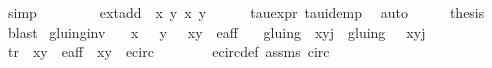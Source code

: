\begin{isabellebody}
\ simp\isanewline
\ \ \isamarkupfalse%
\ \isamarkupfalse%
\ {\isachardoublequoteopen}{\isachardot}{\isachardot}{\isachardot}\ {\isacharequal}\ {\isasymtau}\ {\isacharparenleft}ext{\isacharunderscore}add\ {\isacharparenleft}{\isasymtau}\ {\isacharparenleft}x{}{\isacharcomma}\ y{}{\isacharparenright}{\isacharparenright}\ {\isacharparenleft}x{}{\isacharcomma}\ y{}{\isacharparenright}{\isacharparenright}{\isachardoublequoteclose}\isanewline
\ \ \ \ \isamarkupfalse%
\ tau{\isacharunderscore}expr\ tau{\isacharunderscore}idemp\ \isamarkupfalse%
\ auto\isanewline
\ \ \isamarkupfalse%
\ \isamarkupfalse%
\ {\isacharquery}thesis\ \isamarkupfalse%
\ blast\isanewline
{}\isamarkupfalse%
%
\endisatagproof
{\isafoldproof}%
%
\isadelimproof
\isanewline
%
\endisadelimproof
\isanewline
{}\isamarkupfalse%
\ gluing{\isacharunderscore}inv{\isacharcolon}\isanewline
\ \ \ {\isachardoublequoteopen}x\ {\isasymnoteq}\ {}{\isachardoublequoteclose}\ {\isachardoublequoteopen}y\ {\isasymnoteq}\ {}{\isachardoublequoteclose}\ {\isachardoublequoteopen}{\isacharparenleft}x{\isacharcomma}y{\isacharparenright}\ {\isasymin}\ e{\isacharunderscore}aff{\isachardoublequoteclose}\isanewline
\ \ \ {\isachardoublequoteopen}gluing\ {\isacharbackquote}{\isacharbackquote}\ {\isacharbraceleft}{\isacharparenleft}{\isacharparenleft}x{\isacharcomma}y{\isacharparenright}{\isacharcomma}j{\isacharparenright}{\isacharbraceright}\ {\isacharequal}\ gluing\ {\isacharbackquote}{\isacharbackquote}\ {\isacharbraceleft}{\isacharparenleft}{\isasymtau}\ {\isacharparenleft}x{\isacharcomma}y{\isacharparenright}{\isacharcomma}j{\isacharplus}{}{\isacharparenright}{\isacharbraceright}{\isachardoublequoteclose}\isanewline
%
\isadelimproof
%
\endisadelimproof
%
\isatagproof
{}\isamarkupfalse%
\isanewline
\ \ \isamarkupfalse%
\ tr{\isacharcolon}\ {\isachardoublequoteopen}{\isasymtau}\ {\isacharparenleft}x{\isacharcomma}y{\isacharparenright}\ {\isasymin}\ e{\isacharunderscore}aff{\isachardoublequoteclose}\ {\isachardoublequoteopen}{\isasymtau}\ {\isacharparenleft}x{\isacharcomma}y{\isacharparenright}\ {\isasymin}\ e{\isacharunderscore}circ{\isachardoublequoteclose}\isanewline
\ \ \ \ \ \ \isamarkupfalse%
\ e{\isacharunderscore}circ{\isacharunderscore}def\ assms\ {\isasymtau}{\isacharunderscore}circ\ \isamarkupfalse%

\end{isabellebody}
